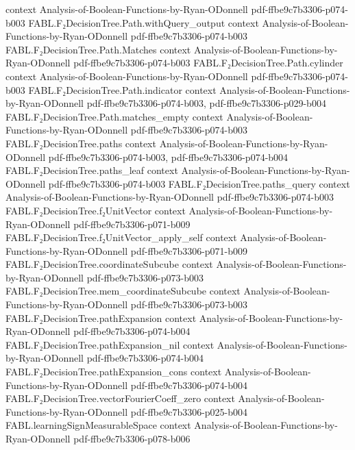 \begin{theorem}
  {context}
  {Analysis-of-Boolean-Functions-by-Ryan-ODonnell}
  {pdf-ffbe9c7b3306-p074-b003}
\proofstep
  {FABL.F₂DecisionTree.Path.withQuery_output}
  {context}
  {Analysis-of-Boolean-Functions-by-Ryan-ODonnell}
  {pdf-ffbe9c7b3306-p074-b003}
\proofstep
  {FABL.F₂DecisionTree.Path.Matches}
  {context}
  {Analysis-of-Boolean-Functions-by-Ryan-ODonnell}
  {pdf-ffbe9c7b3306-p074-b003}
\proofstep
  {FABL.F₂DecisionTree.Path.cylinder}
  {context}
  {Analysis-of-Boolean-Functions-by-Ryan-ODonnell}
  {pdf-ffbe9c7b3306-p074-b003}
\proofstep
  {FABL.F₂DecisionTree.Path.indicator}
  {context}
  {Analysis-of-Boolean-Functions-by-Ryan-ODonnell}
  {pdf-ffbe9c7b3306-p074-b003,
    pdf-ffbe9c7b3306-p029-b004}
\proofstep
  {FABL.F₂DecisionTree.Path.matches_empty}
  {context}
  {Analysis-of-Boolean-Functions-by-Ryan-ODonnell}
  {pdf-ffbe9c7b3306-p074-b003}
\proofstep
  {FABL.F₂DecisionTree.paths}
  {context}
  {Analysis-of-Boolean-Functions-by-Ryan-ODonnell}
  {pdf-ffbe9c7b3306-p074-b003,
    pdf-ffbe9c7b3306-p074-b004}
\proofstep
  {FABL.F₂DecisionTree.paths_leaf}
  {context}
  {Analysis-of-Boolean-Functions-by-Ryan-ODonnell}
  {pdf-ffbe9c7b3306-p074-b003}
\proofstep
  {FABL.F₂DecisionTree.paths_query}
  {context}
  {Analysis-of-Boolean-Functions-by-Ryan-ODonnell}
  {pdf-ffbe9c7b3306-p074-b003}
\proofstep
  {FABL.F₂DecisionTree.f₂UnitVector}
  {context}
  {Analysis-of-Boolean-Functions-by-Ryan-ODonnell}
  {pdf-ffbe9c7b3306-p071-b009}
\proofstep
  {FABL.F₂DecisionTree.f₂UnitVector_apply_self}
  {context}
  {Analysis-of-Boolean-Functions-by-Ryan-ODonnell}
  {pdf-ffbe9c7b3306-p071-b009}
\proofstep
  {FABL.F₂DecisionTree.coordinateSubcube}
  {context}
  {Analysis-of-Boolean-Functions-by-Ryan-ODonnell}
  {pdf-ffbe9c7b3306-p073-b003}
\proofstep
  {FABL.F₂DecisionTree.mem_coordinateSubcube}
  {context}
  {Analysis-of-Boolean-Functions-by-Ryan-ODonnell}
  {pdf-ffbe9c7b3306-p073-b003}
\proofstep
  {FABL.F₂DecisionTree.pathExpansion}
  {context}
  {Analysis-of-Boolean-Functions-by-Ryan-ODonnell}
  {pdf-ffbe9c7b3306-p074-b004}
\proofstep
  {FABL.F₂DecisionTree.pathExpansion_nil}
  {context}
  {Analysis-of-Boolean-Functions-by-Ryan-ODonnell}
  {pdf-ffbe9c7b3306-p074-b004}
\proofstep
  {FABL.F₂DecisionTree.pathExpansion_cons}
  {context}
  {Analysis-of-Boolean-Functions-by-Ryan-ODonnell}
  {pdf-ffbe9c7b3306-p074-b004}
\proofstep
  {FABL.F₂DecisionTree.vectorFourierCoeff_zero}
  {context}
  {Analysis-of-Boolean-Functions-by-Ryan-ODonnell}
  {pdf-ffbe9c7b3306-p025-b004}
\proofstep
  {FABL.learningSignMeasurableSpace}
  {context}
  {Analysis-of-Boolean-Functions-by-Ryan-ODonnell}
  {pdf-ffbe9c7b3306-p078-b006}

\end{theorem}
